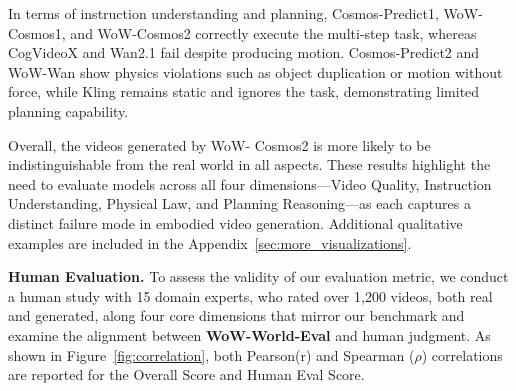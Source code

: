 In terms of instruction understanding and planning, Cosmos-Predict1, WoW-Cosmos1, and WoW-Cosmos2 correctly execute the multi-step task, whereas CogVideoX and Wan2.1 fail despite producing motion. Cosmos-Predict2 and WoW-Wan show physics violations such as object duplication or motion without force, while Kling remains static and ignores the task, demonstrating limited planning capability.

Overall, the videos generated by WoW-
Cosmos2 is more likely to be indistinguishable from the real world in all aspects. These results highlight the need to evaluate models across all four dimensions—Video Quality, Instruction Understanding, Physical Law, and Planning Reasoning—as each captures a distinct failure mode in embodied video generation. Additional qualitative examples are included in the Appendix~\ref{sec:more_visualizations}.




\textbf{Human Evaluation.} To assess the validity of our evaluation metric, we conduct a human study with 15 domain experts, who rated over 1,200 videos, both real and generated, along four core dimensions that mirror our benchmark and examine the alignment between \textbf{WoW-World-Eval} and human judgment. As shown in Figure~\ref{fig:correlation}, both Pearson(r) and Spearman ($\rho$) correlations are reported for the Overall Score and Human Eval Score.

